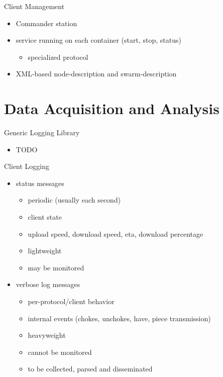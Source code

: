 \documentclass{beamer}
\begin{document}
\begin{frame}{Client Management}
  \begin{itemize}
    \item Commander station
    \item service running on each container (start, stop, status)
      \begin{itemize}
        \item specialized protocol
      \end{itemize}
    \item XML-based node-description and swarm-description
  \end{itemize}
\end{frame}

\section{Data Acquisition and Analysis}

\begin{frame}{Generic Logging Library}
  \begin{itemize}
    \item TODO
  \end{itemize}
\end{frame}

\begin{frame}{Client Logging}
  \begin{itemize}
    \item status messages
      \begin{itemize}
        \item periodic (usually each second)
        \item client state
        \item upload speed, download speed, eta, download percentage
        \item lightweight
        \item may be monitored
      \end{itemize}
    \item verbose log messages
      \begin{itemize}
        \item per-protocol/client behavior
        \item internal events (chokes, unchokes, have, piece transmission)
        \item heavyweight
        \item cannot be monitored
        \item to be collected, parsed and disseminated
      \end{itemize}
  \end{itemize}
\end{frame}
\end{document}
